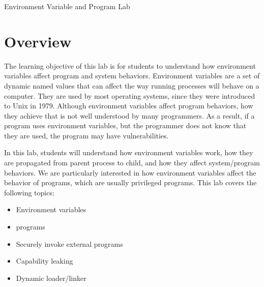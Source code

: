 
\newcommand{\commonfolder}{../../common-files}










\begin{center}
{\LARGE Environment Variable and \setuid Program Lab}
\end{center}



\section{Overview}

The learning objective of this lab is for students to understand how
environment variables affect program and system behaviors. Environment
variables are a set of dynamic named values that can affect the way running processes
will behave on a computer. They are used by most operating systems, since
they were introduced to Unix in 1979. Although environment variables affect
program behaviors, how they achieve that is not well understood by many
programmers. As a result, if a program uses  environment
variables,  but the programmer does not know that they are used, the program
may have vulnerabilities.

In this lab, students will understand how
environment variables work, how they are propagated from parent process to
child, and how they affect system/program behaviors. We are particularly
interested in how environment variables affect the behavior of \setuid
programs, which are usually privileged programs.
This lab covers the following topics:

\begin{itemize}[noitemsep]
\item Environment variables
\item \setuid programs
\item Securely invoke external programs
\item Capability leaking
\item Dynamic loader/linker
\end{itemize}


